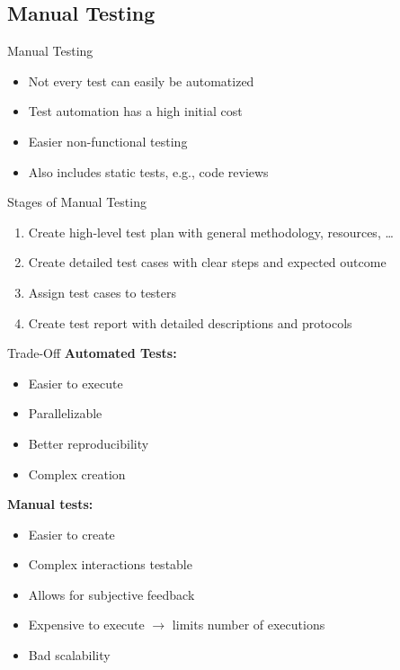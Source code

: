 \subsection{Manual Testing}
\begin{frame}{\insertsubsection}
	\begin{fancycolumns}[animation=none]
		\begin{definition}{Manual Testing}
			\begin{itemize}
				\item Not every test can easily be automatized
				\item Test automation has a high initial cost
				\item Easier non-functional testing
				\item Also includes static tests, e.g., code reviews
			\end{itemize}
		\end{definition}\pause
		\begin{note}{Stages of Manual Testing}
			\begin{enumerate}
				\item Create high-level test plan with general methodology, resources, \dots
				\item Create detailed test cases with clear steps and expected outcome
				\item Assign test cases to testers
				\item Create test report with detailed descriptions and protocols
			\end{enumerate}
		\end{note} \pause
		\nextcolumn
		\begin{note}{Trade-Off}
			\textbf{Automated Tests:}
			\begin{itemize}
				\item Easier to execute
				\item Parallelizable
				\item Better reproducibility
				\item Complex creation
			\end{itemize} \pause
			\textbf{Manual tests:}
			\begin{itemize}
				\item Easier to create
				\item Complex interactions testable
				\item Allows for subjective feedback
				\item Expensive to execute $\rightarrow$ limits number of executions
				\item Bad scalability 
			\end{itemize}
		\end{note}
		
	\end{fancycolumns}
\end{frame}

